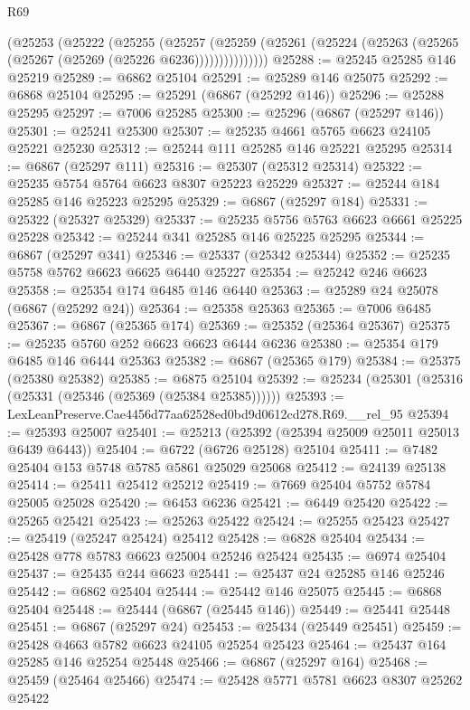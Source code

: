 \begin{lexlean}{R69}
\begin{coremodule}
{          (@25253
            (@25222
              (@25255
                (@25257
                  (@25259
                    (@25261 (@25224 (@25263 (@25265 (@25267 (@25269 (@25226 @6236)))))))))))))))
@25288 := @25245 @25285 @146 @25219
@25289 := @6862 @25104
@25291 := @25289 @146 @25075
@25292 := @6868 @25104
@25295 := @25291 (@6867 (@25292 @146))
@25296 := @25288 @25295
@25297 := @7006 @25285
@25300 := @25296 (@6867 (@25297 @146))
@25301 := @25241 @25300
@25307 := @25235 @4661 @5765 @6623 @24105 @25221 @25230
@25312 := @25244 @111 @25285 @146 @25221 @25295
@25314 := @6867 (@25297 @111)
@25316 := @25307 (@25312 @25314)
@25322 := @25235 @5754 @5764 @6623 @8307 @25223 @25229
@25327 := @25244 @184 @25285 @146 @25223 @25295
@25329 := @6867 (@25297 @184)
@25331 := @25322 (@25327 @25329)
@25337 := @25235 @5756 @5763 @6623 @6661 @25225 @25228
@25342 := @25244 @341 @25285 @146 @25225 @25295
@25344 := @6867 (@25297 @341)
@25346 := @25337 (@25342 @25344)
@25352 := @25235 @5758 @5762 @6623 @6625 @6440 @25227
@25354 := @25242 @246 @6623
@25358 := @25354 @174 @6485 @146 @6440
@25363 := @25289 @24 @25078 (@6867 (@25292 @24))
@25364 := @25358 @25363
@25365 := @7006 @6485
@25367 := @6867 (@25365 @174)
@25369 := @25352 (@25364 @25367)
@25375 := @25235 @5760 @252 @6623 @6623 @6444 @6236
@25380 := @25354 @179 @6485 @146 @6444 @25363
@25382 := @6867 (@25365 @179)
@25384 := @25375 (@25380 @25382)
@25385 := @6875 @25104
@25392 := @25234 (@25301 (@25316 (@25331 (@25346 (@25369 (@25384 @25385))))))
@25393 := LexLeanPreserve.Cae4456d77aa62528ed0bd9d0612cd278.R69.__rel_95
@25394 := @25393 @25007
@25401 := @25213 (@25392 (@25394 @25009 @25011 @25013 @6439 @6443))
@25404 := @6722 (@6726 @25128) @25104
@25411 := @7482 @25404 @153 @5748 @5785 @5861 @25029 @25068
@25412 := @24139 @25138
@25414 := @25411 @25412 @25212
@25419 := @7669 @25404 @5752 @5784 @25005 @25028
@25420 := @6453 @6236
@25421 := @6449 @25420
@25422 := @25265 @25421
@25423 := @25263 @25422
@25424 := @25255 @25423
@25427 := @25419 (@25247 @25424) @25412
@25428 := @6828 @25404
@25434 := @25428 @778 @5783 @6623 @25004 @25246 @25424
@25435 := @6974 @25404
@25437 := @25435 @244 @6623
@25441 := @25437 @24 @25285 @146 @25246
@25442 := @6862 @25404
@25444 := @25442 @146 @25075
@25445 := @6868 @25404
@25448 := @25444 (@6867 (@25445 @146))
@25449 := @25441 @25448
@25451 := @6867 (@25297 @24)
@25453 := @25434 (@25449 @25451)
@25459 := @25428 @4663 @5782 @6623 @24105 @25254 @25423
@25464 := @25437 @164 @25285 @146 @25254 @25448
@25466 := @6867 (@25297 @164)
@25468 := @25459 (@25464 @25466)
@25474 := @25428 @5771 @5781 @6623 @8307 @25262 @25422
}
\end{coremodule}
\end{lexlean}
